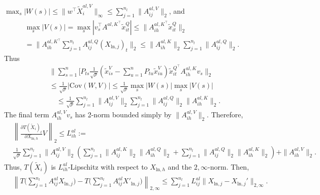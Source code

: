 \documentclass{article}
\begin{document}
$\max_s |W(s)| \leq \|w^\top \tilde X^{al, V}_i\|_\infty\leq \sum_{j=1}^{n_l} \|A^{al, V}_{ij}\|_2$,
and 
\begin{gather*}
\max_s |V(s)| = \max_s |v_s^\top A^{al, K^\top} \tilde x_{it}^{Q}| \leq \|A^{al, K^\top}_{ih}\tilde x_{it}^Q\|_2\\
= \|A^{al, K^\top}_{ih} \sum_{j=1}^{n_l} A^{al, Q}_{ij} (X_{\text{ln},j})_t\|_2 \leq 
\|A^{al, K}_{ih}\|_2 \sum_{j=1}^{n_l} \|A^{al, Q}_{ij}\|_2.
\end{gather*}
Thus
\begin{align*}
  &\|\sum_{s=1}^n [P_{ts}\frac1{\sqrt p} (\tilde x^V_{is} - \sum_{u=1}^n P_{tu} \tilde x^V_{iu}) \tilde x_{it}^{Q^\top}
  A^{al, K}_{ih} v_s \|_2  \\
  & \leq \frac1{\sqrt p}|\mathrm{Cov}(W, V)| \leq \frac1{\sqrt p}\max_s |W(s)| \max_s|V(s)|\\
  &\quad \leq \frac1{\sqrt p}\sum_{j=1}^{n_l} \|A^{al, V}_{ij}\|_2 \sum_{j=1}^{n_l} \|A^{al, Q}_{ij}\|_2 \|A^{al, K}_{ih}\|_2.
\end{align*}
The final term $A^{al, V}_{ih} v_s$ has 2-norm bounded simply by $\|A^{al, V}_{ih}\|_2$. Therefore, 
\begin{align}
  & \left\|\frac{\partial T(\tilde X_i)_t}{\partial X_{\text{ln}, h}} V\right\|_2 \leq L_{ih}^{al} :=
  \label{eq:allip}\\
&\frac1{\sqrt p}\sum_{j=1}^{n_l} \|A^{al, V}_{ij}\|_2 
  \left(\sum_{j=1}^{n_l} \|A^{al, K}_{ij}\|_2 \|A^{al, Q}_{ih}\|_2
  + \sum_{j=1}^{n_l} \|A^{al, Q}_{ij}\|_2 \|A^{al, K}_{ih}\|_2
  \right) + \|A^{al, V}_{ih}\|_2.\nonumber
\end{align}
Thus, $T(\tilde X_i)$ is $L^{al}_{ih}$-Lipschitz with respect to $X_{\text{ln}, h}$ and the $2,\infty$-norm. Then,
\begin{align*}
  &  \left\|T\bigg(\sum_{j=1}^{n_l} A^{al}_{ij} X_{\text{ln}, j}\bigg) - T\bigg(\sum_{j=1}^{n_l} A^{al}_{ij} 
  X'_{\text{ln}, j}\bigg)\right\|_{2,\infty}
  \leq \sum_{j=1}^{n_l} L^{al}_{ij} \|X_{\text{ln}, j} - X_{\text{ln}, j}'\|_{2,\infty}.
\end{align*}
\end{document}
